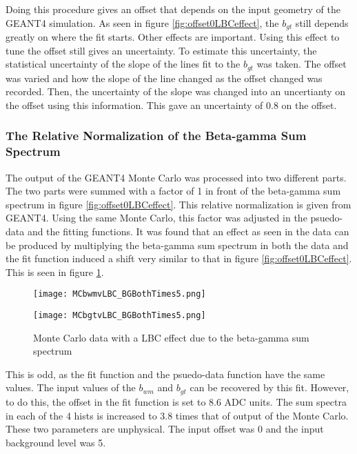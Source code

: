 \documentclass[main.tex]{subfiles}
\begin{document}
Doing this procedure gives an offset that depends on the input geometry of the GEANT4 simulation.
As seen in figure \ref{fig:offset0LBCeffect}, the $b_{gt}$ still depends greatly on where the fit starts.
Other effects are important. 
Using this effect to tune the offset still gives an uncertainty. 
To estimate this uncertainty, the statistical uncertainty of the slope of the lines fit to the $b_{gt}$  was taken.
The offset was varied and how the slope of the line changed as the offset changed was recorded.
Then, the uncertainty of the slope was changed into an uncertianty on the offset using this information.
This gave an uncertainty of 0.8 on the offset.

\subsubsection{The Relative Normalization of the Beta-gamma Sum Spectrum}

The output of the GEANT4 Monte Carlo was processed into two different parts.
The two parts were summed with a factor of 1 in front of the beta-gamma sum spectrum in figure \ref{fig:offset0LBCeffect}.
This relative normalization is given from GEANT4.
Using the same Monte Carlo, this factor was adjusted in the psuedo-data and the fitting functions.
It was found that an effect as seen in the data can be produced by multiplying the beta-gamma sum spectrum in both the data and the fit function induced a shift very similar to that in figure \ref{fig:offset0LBCeffect}.
This is seen in figure \ref{fig:MCTimes5}.    

\begin{figure}
    \centering
    \begin{minipage}{0.50\textwidth}
        \centerline{\texttt{[image: MCbwmvLBC\_BGBothTimes5.png]}}
    \end{minipage}\hfill
    \begin{minipage}{0.50\textwidth}
        \centerline{\texttt{[image: MCbgtvLBC\_BGBothTimes5.png]}}
    \end{minipage}
    \caption{Monte Carlo data with a LBC effect due to the beta-gamma sum spectrum}
    \label{fig:MCTimes5}
\end{figure}

This is odd, as the fit function and the psuedo-data function have the same values.
The input values of the $b_{wm}$ and $b_{gt}$ can be recovered by this fit.
However, to do this, the offset in the fit function is set to 8.6 ADC units.
The sum spectra in each of the 4 hists is increased to 3.8 times that of output of the Monte Carlo.
These two parameters are unphysical.
The input offset was 0 and the input background level was 5.
\end{document}
